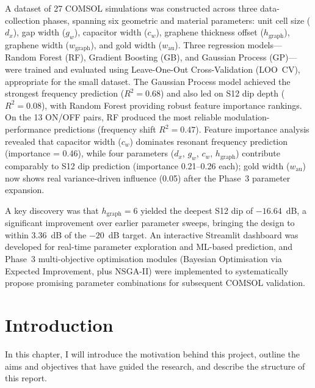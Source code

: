 \documentclass[12pt,a4paper]{report}
\begin{document}
A dataset of 27 COMSOL simulations was constructed across three data-collection phases, spanning six geometric and material parameters: unit cell size ($d_x$), gap width ($g_w$), capacitor width ($c_w$), graphene thickness offset ($h_{\text{graph}}$), graphene width ($w_{\text{graph}}$), and gold width ($w_{\text{au}}$). Three regression models---Random Forest (RF), Gradient Boosting (GB), and Gaussian Process (GP)---were trained and evaluated using Leave-One-Out Cross-Validation (LOO~CV), appropriate for the small dataset. The Gaussian Process model achieved the strongest frequency prediction ($R^2 = 0.68$) and also led on S12 dip depth ($R^2 = 0.08$), with Random Forest providing robust feature importance rankings. On the 13 ON/OFF pairs, RF produced the most reliable modulation-performance predictions (frequency shift $R^2 = 0.47$). Feature importance analysis revealed that capacitor width ($c_w$) dominates resonant frequency prediction (importance = 0.46), while four parameters ($d_x$, $g_w$, $c_w$, $h_{\text{graph}}$) contribute comparably to S12 dip prediction (importance 0.21--0.26 each); gold width ($w_{\text{au}}$) now shows real variance-driven influence (0.05) after the Phase~3 parameter expansion.

A key discovery was that $h_{\text{graph}} = 6$ yielded the deepest S12 dip of $-16.64$~dB, a significant improvement over earlier parameter sweeps, bringing the design to within 3.36~dB of the $-20$~dB target. An interactive Streamlit dashboard was developed for real-time parameter exploration and ML-based prediction, and Phase~3 multi-objective optimisation modules (Bayesian Optimisation via Expected Improvement, plus NSGA-II) were implemented to systematically propose promising parameter combinations for subsequent COMSOL validation.

\tableofcontents
\listoffigures
\listoftables

\chapter{Introduction}
\label{ch:introduction}

In this chapter, I will introduce the motivation behind this project, outline the aims and objectives that have guided the research, and describe the structure of this report.
\end{document}
